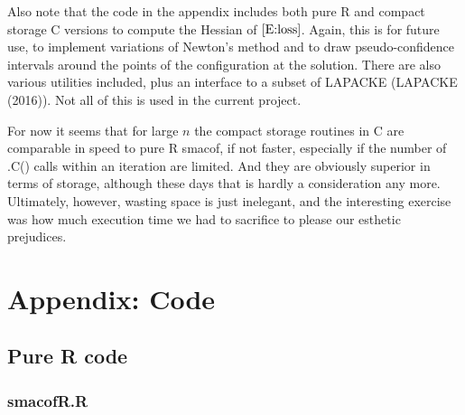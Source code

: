 \documentclass[12pt,]{article}
\begin{document}
Also note that the code in the appendix includes both pure R and compact
storage C versions to compute the Hessian of \(\eqref{E:loss}\). Again,
this is for future use, to implement variations of Newton's method and
to draw pseudo-confidence intervals around the points of the
configuration at the solution. There are also various utilities
included, plus an interface to a subset of LAPACKE (LAPACKE (2016)). Not
all of this is used in the current project.

For now it seems that for large \(n\) the compact storage routines in C
are comparable in speed to pure R smacof, if not faster, especially if
the number of .C() calls within an iteration are limited. And they are
obviously superior in terms of storage, although these days that is
hardly a consideration any more. Ultimately, however, wasting space is
just inelegant, and the interesting exercise was how much execution time
we had to sacrifice to please our esthetic prejudices.

\section{Appendix: Code}\label{appendix-code}

\subsection{Pure R code}\label{pure-r-code}

\subsubsection{smacofR.R}\label{smacofr.r}
\end{document}
